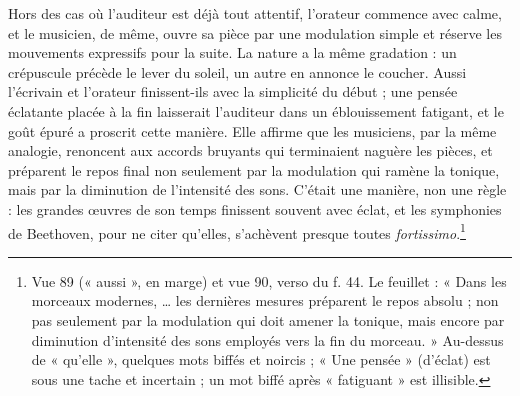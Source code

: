 \documentclass[11pt,a4paper]{article}
\begin{document}
Hors des cas où l'auditeur est déjà tout attentif, l'orateur commence avec calme,
et le musicien, de même, ouvre sa pièce par une modulation simple et réserve les
mouvements expressifs pour la suite. La nature a la même gradation : un
crépuscule précède le lever du soleil, un autre en annonce le coucher. Aussi
l'écrivain et l'orateur finissent-ils avec la simplicité du début ; une pensée
éclatante placée à la fin laisserait l'auditeur dans un éblouissement fatigant,
et le goût épuré a proscrit cette manière. Elle affirme que les musiciens, par la
même analogie, renoncent aux accords bruyants qui terminaient naguère les pièces,
et préparent le repos final non seulement par la modulation qui ramène la tonique,
mais par la diminution de l'intensité des sons. C'était une manière, non une
règle : les grandes œuvres de son temps finissent souvent avec éclat, et les
symphonies de Beethoven, pour ne citer qu'elles, s'achèvent presque toutes
\emph{fortissimo}.\footnote{Vue 89 (« aussi », en marge) et vue 90, verso du
f. 44. Le feuillet : « Dans les morceaux modernes, \ldots{} les dernières
mesures préparent le repos absolu ; non pas seulement par la modulation qui
doit amener la tonique, mais encore par diminution d'intensité des sons
employés vers la fin du morceau. » Au-dessus de « qu'elle », quelques mots
biffés et noircis ; « Une pensée » (d'éclat) est sous une tache et incertain ;
un mot biffé après « fatiguant » est illisible.}
\end{document}
